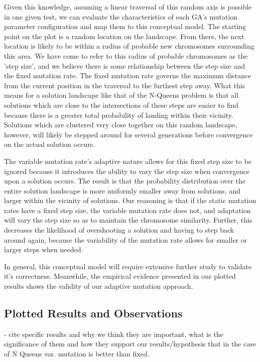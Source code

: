 \documentclass{sig-alternate}
\begin{document}
Given this knowledge, assuming a linear traversal of this random axis is possible in one given test, we can evaluate the characteristics of each GA's mutation parameter configuration and map them to this conceptual model. The starting point on the plot is a random location on the landscape. From there, the next location is likely to be within a radius of probable new chromosomes surrounding this area. We have come to refer to this radius of probable chromosomes as the 'step size', and we believe there is some relationship between the step size and the fixed mutation rate. The fixed mutation rate governs the maximum distance from the current position in the traversal to the furthest step away. What this means for a solution landscape like that of the N-Queens problem is that all solutions which are close to the intersections of these steps are easier to find because there is a greater total probability of landing within their vicinity. Solutions which are clustered very close together on this random landscape, however, will likely be stepped around for several generations before convergence on the actual solution occurs.

The variable mutation rate's adaptive nature allows for this fixed step size to be ignored because it introduces the ability to vary the step size when convergence upon a solution occurs. The result is that the probability distribution over the entire solution landscape is more uniformly smaller away from solutions, and larger within the vicinity of solutions. Our reasoning is that if the static mutation rates have a fixed step size, the variable mutation rate does not, and adaptation will vary the step size so as to maintain the chromosome similarity. Further, this decreases the likelihood of overshooting a solution and having to step back around again, because the variability of the mutation rate allows for smaller or larger steps when needed.

In general, this conceptual model will require extensive further study to validate it's correctness. Meanwhile, the empirical evidence presented in our plotted results shows the validity of our adaptive mutation approach.

\subsection{Plotted Results and Observations}


- cite specific results and why we think they are important, what is the significance
  of them and how they support our results/hypothesis that in the case of N Queens
  var. mutation is better than fixed.
\end{document}

